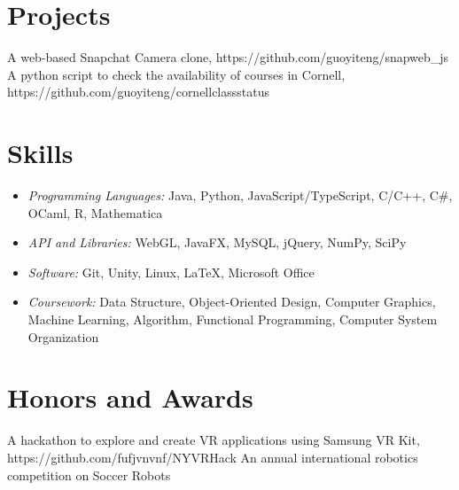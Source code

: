 \documentclass{resume}
\begin{document}
\section{Projects}
A web-based Snapchat Camera clone, https://github.com/guoyiteng/snapweb\_js
A python script to check the availability of courses in Cornell, https://github.com/guoyiteng/cornellclassstatus

\section{Skills}
\begin{itemize}[parsep=0.5ex]
  \item \textit{Programming Languages:} Java, Python, JavaScript/TypeScript, C/C++, C\#, OCaml, R, Mathematica
  \item \textit{API and Libraries:} WebGL, JavaFX, MySQL, jQuery, NumPy, SciPy
  \item \textit{Software: }Git, Unity, Linux, \LaTeX, Microsoft Office
  \item \textit{Coursework: }Data Structure, Object-Oriented Design, Computer Graphics, Machine Learning, Algorithm, Functional Programming, Computer System Organization
\end{itemize}

\section{Honors and Awards}
A hackathon to explore and create VR applications using Samsung VR Kit, https://github.com/fufjvnvnf/NYVRHack
An annual international robotics competition on Soccer Robots

%
%
\end{document}
